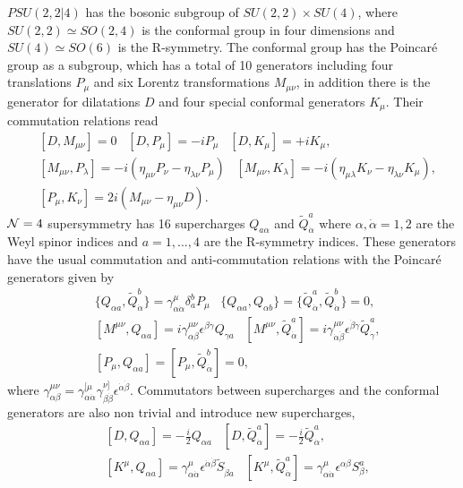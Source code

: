 $PSU(2,2|4)$ has the bosonic subgroup of $SU(2,2) \times SU(4)$, where $SU(2,2) \simeq SO(2,4)$ is the conformal group in four dimensions and $SU(4) \simeq SO(6)$ is the R-symmetry. 
The conformal group has the Poincar\'{e} group as a subgroup, which has a total of 10 generators including four translations $P_\mu$ and six Lorentz transformations $M_{\mu\nu}$, in addition there is the generator for dilatations $D$ and four special conformal generators $K_\mu$. 
Their commutation relations read
\begin{eqnarray}
 &[D, M_{\mu\nu}] = 0 \; \; \; [D, P_\mu] = -i P_\mu \; \; \; [D, K_\mu] = +i K_\mu,  \nonumber\\
 &[M_{\mu\nu}, P_\lambda] = -i(\eta_{\mu\nu} P_\nu - \eta_{\lambda\nu} P_\mu) \; \; \; [M_{\mu\nu}, K_\lambda] = -i(\eta_{\mu\lambda} K_\nu - \eta_{\lambda\nu} K_\mu),  \nonumber\\
 &[P_\mu, K_\nu] = 2i(M_{\mu\nu} - \eta_{\mu\nu} D).
 \label{eq:conformal_group}
\end{eqnarray}
$\mathcal{N}=4$ supersymmetry has 16 supercharges $Q_{a\alpha}$ and $\tilde{Q}^a_{\dot{\alpha}}$ where $\alpha, \dot{\alpha} = 1, 2$ are the Weyl spinor indices and $a = 1,...,4$ are the R-symmetry indices. 
These generators have the usual commutation and anti-commutation relations with the Poincar\'{e} generators given by
\begin{eqnarray}
	& \{Q_{\alpha a}, \tilde{Q}^b_{\dot{\alpha}}\} = \gamma^\mu_{\alpha\dot{\alpha}} \delta_a^b P_\mu \; \; \; \{Q_{\alpha a}, Q_{\alpha b}\} = \{ \tilde{Q}^a_{\dot{\alpha}}, \tilde{Q}^b_{\dot{\alpha}} \} = 0, \nonumber\\
	& [M^{\mu\nu}, Q_{\alpha a}] = i \gamma^{\mu\nu}_{\alpha\beta} \epsilon^{\beta\gamma} Q_{\gamma a} \; \; \; [M^{\mu\nu}, \tilde{Q}^a_{\dot{\alpha}}] = i \gamma^{\mu\nu}_{\dot{\alpha}\dot{\beta}} \epsilon^{\dot{\beta}\dot{\gamma}} \tilde{Q}_{\dot{\gamma}}^a, \nonumber \\
	& [P_\mu, Q_{\alpha a}] = [P_\mu, \tilde{Q}^b_{\dot{\alpha}}] = 0,
\end{eqnarray} 
where $\gamma_{\alpha\beta}^{\mu\nu} = \gamma^{[\mu}_{\alpha\dot{\alpha}} \gamma^{\nu]}_{\beta\dot{\beta}} \epsilon^{\dot{\alpha}\dot{\beta}}$. 
Commutators between supercharges and the conformal generators are also non trivial and introduce new supercharges,
\begin{eqnarray}
	& [D, Q_{\alpha a}] = -\frac{i}{2} Q_{\alpha a} \; \; \; [D, \tilde{Q}_{\dot{\alpha}}^a] = -\frac{i}{2} \tilde{Q}_{\dot{\alpha}}^a, \nonumber \\
	& [K^\mu,  Q_{\alpha a}] = \gamma^\mu_{\alpha\dot{\alpha}} \epsilon^{\dot{\alpha} \dot{\beta}} \tilde{S}_{\dot{\beta} a} \; \; \; [K^\mu, \tilde{Q}_{\dot{\alpha}}^a] = \gamma^\mu_{\alpha\dot{\alpha}} \epsilon^{\alpha\beta} S_\beta^a,
	\label{eq:dq_commutators}
\end{eqnarray}
